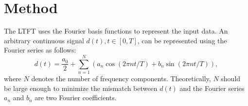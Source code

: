 \section{Method}
The LTFT uses the Fourier basis functions to represent the input data. An arbitrary continuous signal $d(t), t\in[0,T]$, can be represented using the Fourier series as follows:
\begin{equation}
\label{eq:fs}
d(t) = \frac{a_0}{2} + \sum_{n=1}^{N}\left(a_n\cos(2\pi nt/T) + b_n\sin(2\pi nt/T) \right),
\end{equation}
where $N$ denotes the number of frequency components. Theoretically, $N$ should be large enough to minimize the mismatch between $d(t)$ and the Fourier series $a_n$ and $b_n$ are two Fourier coefficients. 


